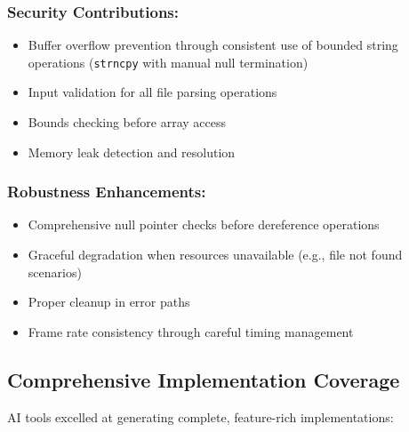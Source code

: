 \documentclass[12pt,a4paper]{article}
\begin{document}
\subsubsection*{Security Contributions:}
\begin{itemize}
    \item Buffer overflow prevention through consistent use of bounded string operations (\texttt{strncpy} with manual null termination)
    \item Input validation for all file parsing operations
    \item Bounds checking before array access
    \item Memory leak detection and resolution
\end{itemize}

\subsubsection*{Robustness Enhancements:}
\begin{itemize}
    \item Comprehensive null pointer checks before dereference operations
    \item Graceful degradation when resources unavailable (e.g., file not found scenarios)
    \item Proper cleanup in error paths
    \item Frame rate consistency through careful timing management
\end{itemize}

\subsection{Comprehensive Implementation Coverage}

AI tools excelled at generating complete, feature-rich implementations:
\end{document}
